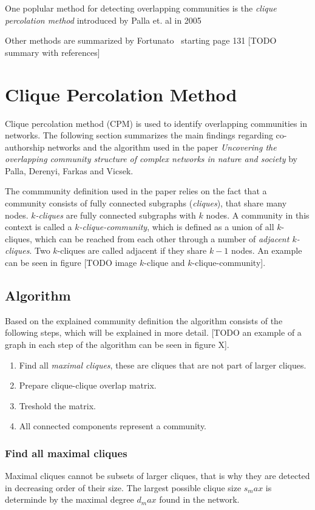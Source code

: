 \documentclass[runningheads,a4paper]{llncs}
\begin{document}
One poplular method for detecting overlapping communities is the \emph{clique percolation method} introduced by Palla et. al in 2005~\cite{palla2005uncovering}

Other methods are summarized by Fortunato~\cite{fortunato2010community} starting page 131 [TODO summary with references]

\section{Clique Percolation Method}
Clique percolation method (CPM) is used to identify overlapping communities in networks. The following section summarizes the main findings regarding co-authorship networks and the algorithm used in the paper \emph{Uncovering the overlapping community structure of complex networks in nature and society} by Palla, Derenyi, Farkas and Vicsek.

The commmunity definition used in the paper relies on the fact that a community consists of fully connected subgraphs (\emph{cliques}), that share many nodes. \emph{$k$-cliques} are fully connected subgraphs with $k$ nodes. A community in this context is called a \emph{$k$-clique-community}, which is defined as a union of all $k$-cliques, which can be reached from each other through a number of \emph{adjacent $k$-cliques}. Two $k$-cliques are called adjacent if they share $k-1$ nodes. An example can be seen in figure [TODO image $k$-clique and $k$-clique-community].

\subsection{Algorithm}
Based on the explained community definition the algorithm consists of the following steps, which will be explained in more detail. [TODO an example of a graph in each step of the algorithm can be seen in figure X].

\begin{enumerate}
\item Find all \emph{maximal cliques}, these are cliques that are not part of larger cliques.
\item Prepare clique-clique overlap matrix.
\item Treshold the matrix.
\item All connected components represent a community.
\end{enumerate}

\subsubsection{Find all maximal cliques}
Maximal cliques cannot be subsets of larger cliques, that is why they are detected in decreasing order of their size. The largest possible clique size $s_max$ is determinde by the maximal degree $d_max$ found in the network.
\end{document}
